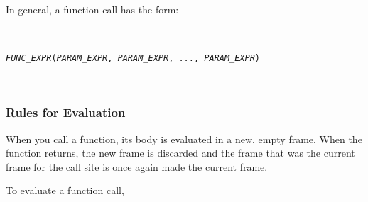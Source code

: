 \documentclass{article}
\newcommand{\expr}[1]{\texttt{#1}}
\newcommand{\mvar}[1]{\expr{\emph{\uppercase{#1}}}}
\newcommand{\pretabularspace}{\ifhevea\else \strut \\ \strut \fi}
\newcommand{\posttabularspace}{\ifhevea\else \strut \\ \strut \fi}
\begin{document}
  In general, a function call has the form:

  \pretabularspace
  \noindent \expr{\mvar{func\_expr}(\mvar{param\_expr}, \mvar{param\_expr}, ..., \mvar{param\_expr})}
  \posttabularspace

\subsubsection{Rules for Evaluation}


When you call a function, its body is evaluated in a new, empty frame.
When the function returns, the new frame is discarded and the frame that
was the current frame for the call site is once again made the current
frame.


  To evaluate a function call,
\end{document}
